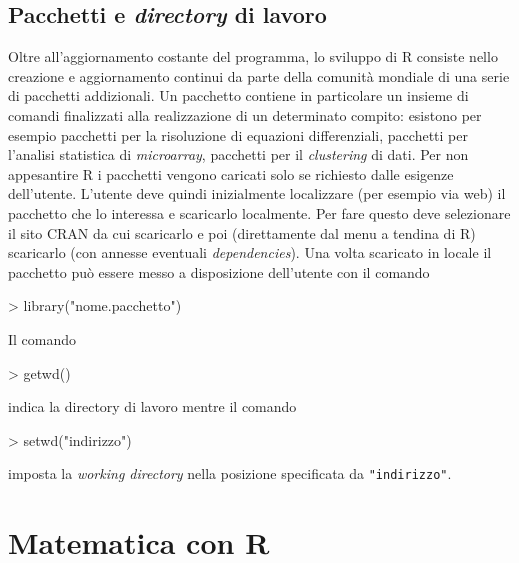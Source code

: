 \documentclass[onecolumn,11pt]{book}
\begin{document}


\section*{Pacchetti e \emph{directory} di lavoro}
Oltre all'aggiornamento costante del programma, lo sviluppo di \textsf{R} consiste nello creazione e aggiornamento continui da parte della comunit\`a  mondiale di una serie di pacchetti addizionali. Un pacchetto contiene in particolare un insieme di comandi finalizzati alla  realizzazione di un determinato compito: esistono per esempio pacchetti per la risoluzione di equazioni differenziali, pacchetti per l'analisi statistica di {\it microarray}, pacchetti per il {\it clustering} di dati.  Per non appesantire \textsf{R} i pacchetti vengono caricati solo se richiesto dalle esigenze dell'utente. 
L'utente deve quindi inizialmente localizzare (per esempio via web) il pacchetto che lo interessa e scaricarlo localmente.  Per fare questo deve selezionare il sito CRAN da cui scaricarlo e poi (direttamente dal menu a tendina di \textsf{R}) scaricarlo (con annesse eventuali {\it dependencies}). Una volta scaricato in locale il pacchetto pu\`o essere messo a disposizione dell'utente con il comando  
\begin{Schunk}
\begin{Sinput}
> library("nome.pacchetto")
\end{Sinput}
\end{Schunk}
Il comando  
\begin{Schunk}
\begin{Sinput}
> getwd()
\end{Sinput}
\end{Schunk}
indica la directory di lavoro mentre il comando 
\begin{Schunk}
\begin{Sinput}
> setwd("indirizzo")
\end{Sinput}
\end{Schunk}
 imposta la {\it working directory}  nella posizione specificata da \texttt{"indirizzo"}.
\newpage
\thispagestyle{empty}
 \chapter{Matematica con \textsf{R}} 
\end{document}
